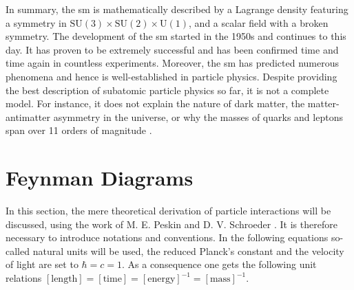 In summary, the \gls{sm} is mathematically described by a Lagrange density featuring a symmetry in $\text{SU}(3)\times \text{SU}(2)\times \text{U}(1)$, and a scalar field with a broken symmetry. The development of the \gls{sm} started in the 1950s and continues to this day. It has proven to be extremely successful and has been confirmed time and time again in countless experiments. Moreover, the \gls{sm} has predicted numerous phenomena and hence is well-established in particle physics. Despite providing the best description of subatomic particle physics so far, it is not a complete model. For instance, it does not explain the nature of dark matter, the matter-antimatter asymmetry in the universe, or why the masses of quarks and leptons span over 11 orders of magnitude \cite{PhDMartti}.

\section{Feynman Diagrams} \label{sec:FeynmanGraphs}
In this section, the mere theoretical derivation of particle interactions will be discussed, using the work of M. E. Peskin  and D. V. Schroeder \cite{IntroductionQFT}. It is therefore necessary to introduce notations and conventions. In the following equations so-called natural units will be used, \ie the reduced Planck's constant and the velocity of light are set to $\hbar = c = 1$. As a consequence one gets the following unit relations $\left[\text{length}\right] = \left[\text{time}\right] = \left[\text{energy}\right]^{-1} = \left[\text{mass}\right]^{-1}$.

